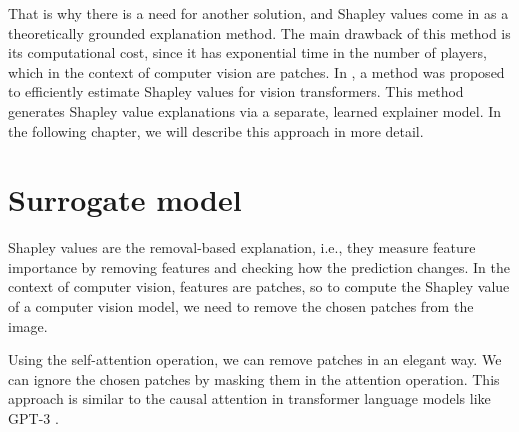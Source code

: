 \documentclass[en]{pracamgr}
\begin{document}
That is why there is a need for another solution, and Shapley values come in as a theoretically grounded explanation method. The main drawback of this method is its computational cost, since it has exponential time in the number of players, which in the context of computer vision are patches. In \cite{DBLP:conf/iclr/Covert0L23}, a method was proposed to efficiently estimate Shapley values for vision transformers. This method generates Shapley value explanations via a separate, learned explainer model. In the following chapter, we will describe this approach in more detail.



\section{Surrogate model}\label{s:surrogate}
Shapley values are the removal-based explanation, i.e., they measure feature importance by removing features and checking how the prediction changes. In the context of computer vision, features are patches, so to compute the Shapley value of a computer vision model, we need to remove the chosen patches from the image.

Using the self-attention operation, we can remove patches in an elegant way. We can ignore the chosen patches by masking them in the attention operation. This approach is similar to the causal attention in transformer language models like GPT-3 \cite{DBLP:conf/nips/BrownMRSKDNSSAA20}.
\end{document}
